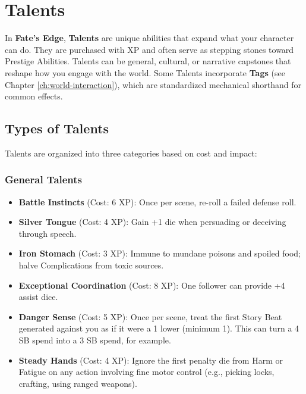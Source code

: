 
\chapter{Talents}
\label{ch:talents}

In \textbf{Fate's Edge}, \textbf{Talents}  are unique abilities that expand what your character can do. They are purchased with XP and often serve as stepping stones toward Prestige Abilities. Talents can be general, cultural, or narrative capstones that reshape how you engage with the world. Some Talents incorporate \textbf{Tags} (see Chapter \ref{ch:world-interaction}), which are standardized mechanical shorthand for common effects.

\section{Types of Talents}

Talents are organized into three categories based on cost and impact:

\subsection*{General Talents}

\begin{itemize}
    \item \textbf{Battle Instincts} (Cost: 6 XP): Once per scene, re-roll a failed defense roll.
    \item \textbf{Silver Tongue} (Cost: 4 XP): Gain +1 die when persuading or deceiving through speech.
    \item \textbf{Iron Stomach} (Cost: 3 XP): Immune to mundane poisons and spoiled food; halve Complications from toxic sources.
    \item \textbf{Exceptional Coordination} (Cost: 8 XP): One follower can provide +4 assist dice.
    \item \textbf{Danger Sense} (Cost: 5 XP): Once per scene, treat the first Story Beat generated against you as if it were a 1 lower (minimum 1). This can turn a 4 SB spend into a 3 SB spend, for example.
    \item \textbf{Steady Hands} (Cost: 4 XP): Ignore the first penalty die from Harm or Fatigue on any action involving fine motor control (e.g., picking locks, crafting, using ranged weapons).
\end{itemize}

